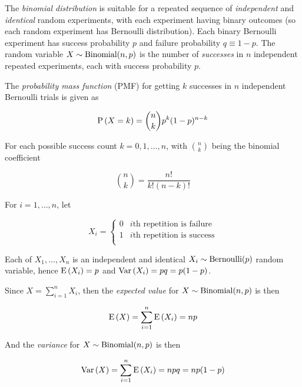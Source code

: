 \begin{definition}
    The \textit{binomial distribution} is suitable for a repeated sequence of \textit{independent} and \textit{identical} random experiments, with each experiment having binary outcomes (so each random experiment has Bernoulli distribution). Each binary Bernoulli experiment has success probability $p$ and failure probability $q \equiv 1 - p$. The random variable $X \sim \mathrm{Binomial}(n, p)$ is the number of \textit{successes} in $n$ independent repeated experiments, each with success probability $p$.
    
    The \textit{probability mass function} (PMF) for getting $k$ successes in $n$ independent Bernoulli trials is given as
    
    \begin{equation}
        \mathrm{P} \left( X = k \right) = \binom{n}{k} p^k (1 - p)^{n - k}
    \end{equation}
    
    For each possible success count $k = 0, 1, \dots, n$, with $\binom{n}{k}$ being the binomial coefficient
    
    \begin{equation}
        \binom{n}{k} = \frac{n!}{k!(n-k)!}
    \end{equation}
    
    For $i = 1, \dots, n$, let
    
    \begin{equation}
        X_i = \begin{cases}
            0 & \text{$i$th repetition is failure} \\
            1 & \text{$i$th repetition is success} \\
        \end{cases}
    \end{equation}
    
    Each of $X_1, \dots, X_n$ is an independent and identical $X_i \sim \mathrm{Bernoulli}(p)$ random variable, hence $\mathrm{E} \left( X_i \right) = p$ and $\mathrm{Var} \left( X_i \right) = pq = p(1 - p)$.
    
    Since $X = \sum \limits_{i=1}^n X_i$, then the \textit{expected value} for $X \sim \mathrm{Binomial}(n, p)$ is then
    
    \begin{equation}
        \mathrm{E} \left( X \right) = \sum \limits_{i=1}^n \mathrm{E} \left( X_i \right) = np
    \end{equation}
    
    And the \textit{variance} for $X \sim \mathrm{Binomial}(n, p)$ is then
    
    \begin{equation}
        \mathrm{Var} \left( X \right) = \sum \limits_{i=1}^n \mathrm{E} \left( X_i \right) = npq = np(1-p)
    \end{equation}
\end{definition}

